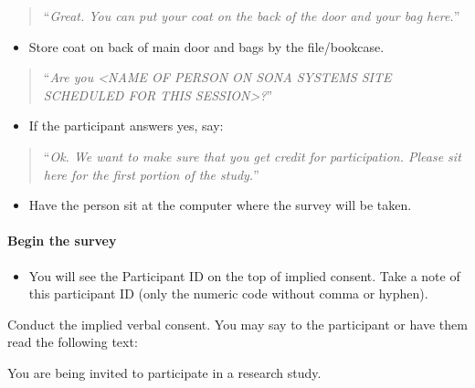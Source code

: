 \documentclass[]{article}
\providecommand{\tightlist}{%
  \setlength{\itemsep}{0pt}\setlength{\parskip}{0pt}}
\let\oldparagraph\paragraph
\renewcommand{\paragraph}[1]{\oldparagraph{#1}\mbox{}}
\begin{document}
\begin{quote}
``\emph{Great. You can put your coat on the back of the door and your
bag here.}''
\end{quote}

\begin{itemize}
\tightlist
\item
  Store coat on back of main door and bags by the file/bookcase.
\end{itemize}

\begin{quote}
``\emph{Are you \textless{}NAME OF PERSON ON SONA SYSTEMS SITE SCHEDULED
FOR THIS SESSION\textgreater{}?}''
\end{quote}

\begin{itemize}
\tightlist
\item
  If the participant answers yes, say:
\end{itemize}

\begin{quote}
``\emph{Ok. We want to make sure that you get credit for participation.
Please sit here for the first portion of the study.}''
\end{quote}

\begin{itemize}
\tightlist
\item
  Have the person sit at the computer where the survey will be taken.
\end{itemize}

\paragraph{Begin the survey}\label{begin-the-survey}

\begin{itemize}
\tightlist
\item
  You will see the Participant ID on the top of implied consent. Take a
  note of this participant ID (only the numeric code without comma or
  hyphen).
\end{itemize}

Conduct the implied verbal consent. You may say to the participant or
have them read the following text:

You are being invited to participate in a research study.
\end{document}
